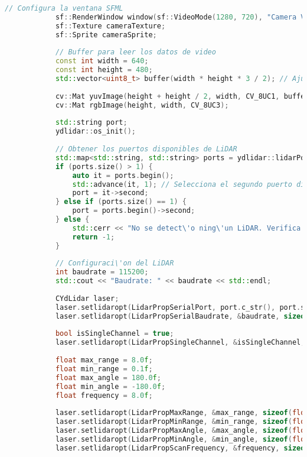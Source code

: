 \begin{lstlisting}[language={C++}, caption={Primera versi\'on del c\'odigo del sistema de control del robot}, label={Script}]
            // Configura la ventana SFML
            sf::RenderWindow window(sf::VideoMode(1280, 720), "Camera Visualization with LiDAR");
            sf::Texture cameraTexture;
            sf::Sprite cameraSprite;
        
            // Buffer para leer los datos de video
            const int width = 640;
            const int height = 480;
            std::vector<uint8_t> buffer(width * height * 3 / 2); // Ajusta el tama\~no del buffer para YUV420
        
            cv::Mat yuvImage(height + height / 2, width, CV_8UC1, buffer.data());
            cv::Mat rgbImage(height, width, CV_8UC3);
        
            std::string port;
            ydlidar::os_init();
        
            // Obtener los puertos disponibles de LiDAR
            std::map<std::string, std::string> ports = ydlidar::lidarPortList();
            if (ports.size() > 1) {
                auto it = ports.begin();
                std::advance(it, 1); // Selecciona el segundo puerto disponible
                port = it->second;
            } else if (ports.size() == 1) {
                port = ports.begin()->second;
            } else {
                std::cerr << "No se detect\'o ning\'un LiDAR. Verifica la conexi\'on." << std::endl;
                return -1;
            }
        
            // Configuraci\'on del LiDAR
            int baudrate = 115200;
            std::cout << "Baudrate: " << baudrate << std::endl;
        
            CYdLidar laser;
            laser.setlidaropt(LidarPropSerialPort, port.c_str(), port.size());
            laser.setlidaropt(LidarPropSerialBaudrate, &baudrate, sizeof(int));
        
            bool isSingleChannel = true;
            laser.setlidaropt(LidarPropSingleChannel, &isSingleChannel, sizeof(bool));
        
            float max_range = 8.0f;
            float min_range = 0.1f;
            float max_angle = 180.0f;
            float min_angle = -180.0f;
            float frequency = 8.0f;
        
            laser.setlidaropt(LidarPropMaxRange, &max_range, sizeof(float));
            laser.setlidaropt(LidarPropMinRange, &min_range, sizeof(float));
            laser.setlidaropt(LidarPropMaxAngle, &max_angle, sizeof(float));
            laser.setlidaropt(LidarPropMinAngle, &min_angle, sizeof(float));
            laser.setlidaropt(LidarPropScanFrequency, &frequency, sizeof(float));
        

\end{lstlisting}
